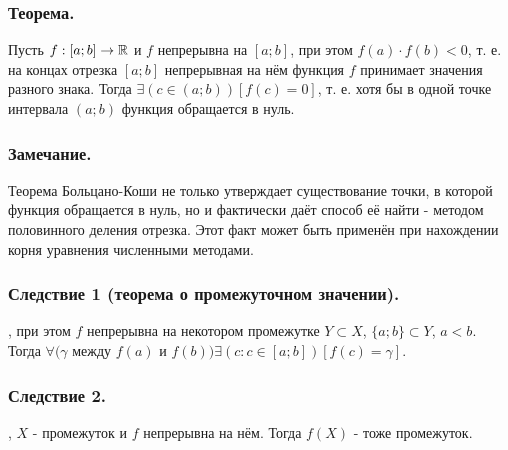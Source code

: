 \subsubsection{Теорема.}
Пусть $f:[a;b]\to \mathbb{R}$ и $f$ непрерывна на $[a;b]$, при этом $f(a) \cdot f(b) <0$,
т. е. на концах отрезка $[a;b]$ непрерывная на нём функция $f$ принимает значения разного знака.
Тогда $\exists(c \in (a;b))[f(c)=0]$,
т. е. хотя бы в одной точке интервала $(a;b)$ функция обращается в нуль.

\subsubsection{Замечание.}
Теорема Больцано-Коши не только утверждает существование точки, в которой функция обращается в нуль, но и фактически даёт способ её найти - методом половинного деления отрезка. Этот факт может быть применён при нахождении корня уравнения численными методами.

\subsubsection{Следствие 1 (теорема о промежуточном значении).}
\fXR, при этом $f$ непрерывна на некотором промежутке $Y \subset X$, $\{a;b\}\subset Y$, $a<b$.
Тогда $\forall(\gamma$ между $f(a)$ и $f(b))\exists(c:c\in[a;b])[f(c)=\gamma]$.

\subsubsection{Следствие 2.}
\fXR, $X$ - промежуток и $f$ непрерывна на нём.
Тогда $f(X)$ - тоже промежуток.


 

